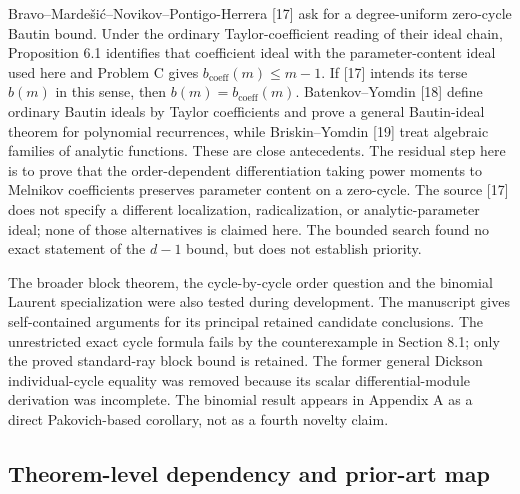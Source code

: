 \documentclass[
  11pt,
  a4paper,
]{amsart}
\newcounter{none} %
\begin{document}
Bravo--Mardešić--Novikov--Pontigo-Herrera {[}17{]} ask for a
degree-uniform zero-cycle Bautin bound. Under the ordinary
Taylor-coefficient reading of their ideal chain, Proposition 6.1
identifies that coefficient ideal with the parameter-content ideal used
here and Problem C gives \(b_{\mathrm{coeff}}(m)\le m-1\). If {[}17{]}
intends its terse \(b(m)\) in this sense, then
\(b(m)=b_{\mathrm{coeff}}(m)\). Batenkov--Yomdin {[}18{]} define
ordinary Bautin ideals by Taylor coefficients and prove a general
Bautin-ideal theorem for polynomial recurrences, while Briskin--Yomdin
{[}19{]} treat algebraic families of analytic functions. These are close
antecedents. The residual step here is to prove that the order-dependent
differentiation taking power moments to Melnikov coefficients preserves
parameter content on a zero-cycle. The source {[}17{]} does not specify
a different localization, radicalization, or analytic-parameter ideal;
none of those alternatives is claimed here. The bounded search found no
exact statement of the \(d-1\) bound, but does not establish priority.

The broader block theorem, the cycle-by-cycle order question and the
binomial Laurent specialization were also tested during development. The
manuscript gives self-contained arguments for its principal retained
candidate conclusions. The unrestricted exact cycle formula fails by the
counterexample in Section 8.1; only the proved standard-ray block bound
is retained. The former general Dickson individual-cycle equality was
removed because its scalar differential-module derivation was
incomplete. The binomial result appears in Appendix A as a direct
Pakovich-based corollary, not as a fourth novelty claim.

\subsection{Theorem-level dependency and prior-art map}
\end{document}
